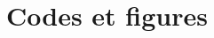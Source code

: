 \documentclass[10pt,a4paper,twoside,twocolumn]{report}
\newcommand*{\rootPath}{}
\begin{document}
\section{Codes et figures}






\clearpage
{}



 \listoffigures

\clearpage
\begingroup
	\let\clearpage\relax
	\onecolumn
	 \listoftables
	 \listofalgorithms
	 \listofcode
\endgroup


\end{document}

